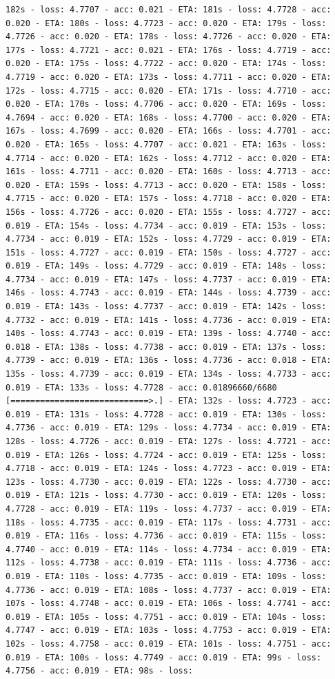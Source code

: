\documentclass[11pt]{article}
\begin{document}
\begin{Verbatim}[commandchars=\\\{\}]
182s - loss: 4.7707 - acc: 0.021 - ETA: 181s - loss: 4.7728 - acc: 0.020 - ETA: 180s - loss: 4.7723 - acc: 0.020 - ETA: 179s - loss: 4.7726 - acc: 0.020 - ETA: 178s - loss: 4.7726 - acc: 0.020 - ETA: 177s - loss: 4.7721 - acc: 0.021 - ETA: 176s - loss: 4.7719 - acc: 0.020 - ETA: 175s - loss: 4.7722 - acc: 0.020 - ETA: 174s - loss: 4.7719 - acc: 0.020 - ETA: 173s - loss: 4.7711 - acc: 0.020 - ETA: 172s - loss: 4.7715 - acc: 0.020 - ETA: 171s - loss: 4.7710 - acc: 0.020 - ETA: 170s - loss: 4.7706 - acc: 0.020 - ETA: 169s - loss: 4.7694 - acc: 0.020 - ETA: 168s - loss: 4.7700 - acc: 0.020 - ETA: 167s - loss: 4.7699 - acc: 0.020 - ETA: 166s - loss: 4.7701 - acc: 0.020 - ETA: 165s - loss: 4.7707 - acc: 0.021 - ETA: 163s - loss: 4.7714 - acc: 0.020 - ETA: 162s - loss: 4.7712 - acc: 0.020 - ETA: 161s - loss: 4.7711 - acc: 0.020 - ETA: 160s - loss: 4.7713 - acc: 0.020 - ETA: 159s - loss: 4.7713 - acc: 0.020 - ETA: 158s - loss: 4.7715 - acc: 0.020 - ETA: 157s - loss: 4.7718 - acc: 0.020 - ETA: 156s - loss: 4.7726 - acc: 0.020 - ETA: 155s - loss: 4.7727 - acc: 0.019 - ETA: 154s - loss: 4.7734 - acc: 0.019 - ETA: 153s - loss: 4.7734 - acc: 0.019 - ETA: 152s - loss: 4.7729 - acc: 0.019 - ETA: 151s - loss: 4.7727 - acc: 0.019 - ETA: 150s - loss: 4.7727 - acc: 0.019 - ETA: 149s - loss: 4.7729 - acc: 0.019 - ETA: 148s - loss: 4.7734 - acc: 0.019 - ETA: 147s - loss: 4.7737 - acc: 0.019 - ETA: 146s - loss: 4.7743 - acc: 0.019 - ETA: 144s - loss: 4.7739 - acc: 0.019 - ETA: 143s - loss: 4.7737 - acc: 0.019 - ETA: 142s - loss: 4.7732 - acc: 0.019 - ETA: 141s - loss: 4.7736 - acc: 0.019 - ETA: 140s - loss: 4.7743 - acc: 0.019 - ETA: 139s - loss: 4.7740 - acc: 0.018 - ETA: 138s - loss: 4.7738 - acc: 0.019 - ETA: 137s - loss: 4.7739 - acc: 0.019 - ETA: 136s - loss: 4.7736 - acc: 0.018 - ETA: 135s - loss: 4.7739 - acc: 0.019 - ETA: 134s - loss: 4.7733 - acc: 0.019 - ETA: 133s - loss: 4.7728 - acc: 0.01896660/6680 [============================>.] - ETA: 132s - loss: 4.7723 - acc: 0.019 - ETA: 131s - loss: 4.7728 - acc: 0.019 - ETA: 130s - loss: 4.7736 - acc: 0.019 - ETA: 129s - loss: 4.7734 - acc: 0.019 - ETA: 128s - loss: 4.7726 - acc: 0.019 - ETA: 127s - loss: 4.7721 - acc: 0.019 - ETA: 126s - loss: 4.7724 - acc: 0.019 - ETA: 125s - loss: 4.7718 - acc: 0.019 - ETA: 124s - loss: 4.7723 - acc: 0.019 - ETA: 123s - loss: 4.7730 - acc: 0.019 - ETA: 122s - loss: 4.7730 - acc: 0.019 - ETA: 121s - loss: 4.7730 - acc: 0.019 - ETA: 120s - loss: 4.7728 - acc: 0.019 - ETA: 119s - loss: 4.7737 - acc: 0.019 - ETA: 118s - loss: 4.7735 - acc: 0.019 - ETA: 117s - loss: 4.7731 - acc: 0.019 - ETA: 116s - loss: 4.7736 - acc: 0.019 - ETA: 115s - loss: 4.7740 - acc: 0.019 - ETA: 114s - loss: 4.7734 - acc: 0.019 - ETA: 112s - loss: 4.7738 - acc: 0.019 - ETA: 111s - loss: 4.7736 - acc: 0.019 - ETA: 110s - loss: 4.7735 - acc: 0.019 - ETA: 109s - loss: 4.7736 - acc: 0.019 - ETA: 108s - loss: 4.7737 - acc: 0.019 - ETA: 107s - loss: 4.7748 - acc: 0.019 - ETA: 106s - loss: 4.7741 - acc: 0.019 - ETA: 105s - loss: 4.7751 - acc: 0.019 - ETA: 104s - loss: 4.7747 - acc: 0.019 - ETA: 103s - loss: 4.7753 - acc: 0.019 - ETA: 102s - loss: 4.7758 - acc: 0.019 - ETA: 101s - loss: 4.7751 - acc: 0.019 - ETA: 100s - loss: 4.7749 - acc: 0.019 - ETA: 99s - loss: 4.7756 - acc: 0.019 - ETA: 98s - loss: 
\end{Verbatim}
\end{document}

